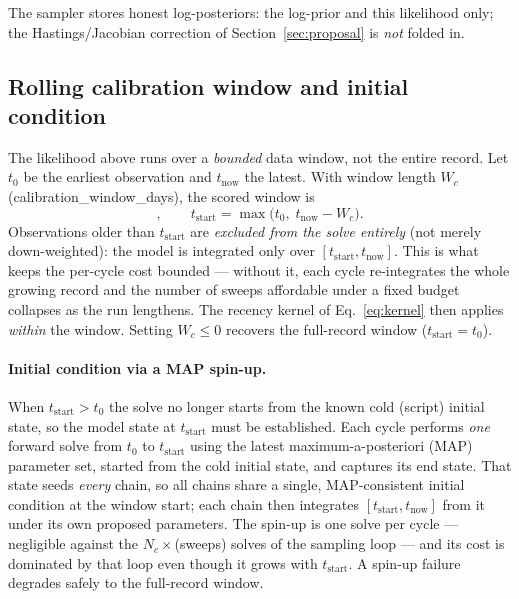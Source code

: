 \documentclass[11pt]{article}
\newcommand{\param}[1]{\textsf{#1}}
\begin{document}
The sampler stores honest log-posteriors:
the log-prior and this likelihood only; the Hastings/Jacobian correction
of Section~\ref{sec:proposal} is \emph{not} folded in.

\subsection{Rolling calibration window and initial
condition}\label{sec:window}
The likelihood above runs over a \emph{bounded} data window, not the
entire record. Let $t_0$ be the earliest observation and $t_{\text{now}}$
the latest. With window length $W_c$ (\param{calibration\_window\_days}),
the scored window is
\begin{equation}
  [t_{\text{start}},\,t_{\text{now}}],\qquad
  t_{\text{start}} = \max\!\big(t_0,\; t_{\text{now}} - W_c\big).
\end{equation}
Observations older than $t_{\text{start}}$ are \emph{excluded from the
solve entirely} (not merely down-weighted): the model is integrated only
over $[t_{\text{start}}, t_{\text{now}}]$. This is what keeps the
per-cycle cost bounded --- without it, each cycle re-integrates the whole
growing record and the number of sweeps affordable under a fixed budget
collapses as the run lengthens. The recency kernel of
Eq.~\eqref{eq:kernel} then applies \emph{within} the window. Setting
$W_c \le 0$ recovers the full-record window ($t_{\text{start}}=t_0$).

\paragraph{Initial condition via a MAP spin-up.} When
$t_{\text{start}} > t_0$ the solve no longer starts from the known cold
(script) initial state, so the model state at $t_{\text{start}}$ must be
established. Each cycle performs \emph{one} forward solve from $t_0$ to
$t_{\text{start}}$ using the latest maximum-a-posteriori (MAP) parameter
set, started from the cold initial state, and captures its end state.
That state seeds \emph{every} chain, so all chains share a single,
MAP-consistent initial condition at the window start; each chain then
integrates $[t_{\text{start}}, t_{\text{now}}]$ from it under its own
proposed parameters. The spin-up is one solve per cycle --- negligible
against the $N_c \times$(sweeps) solves of the sampling loop --- and its
cost is dominated by that loop even though it grows with $t_{\text{start}}$.
A spin-up failure degrades safely to the full-record window.
\end{document}
